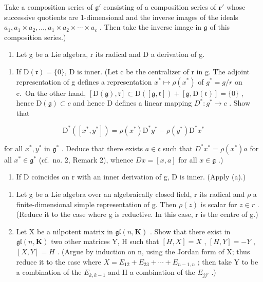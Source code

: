 Take a composition series of \(\mathfrak{g}'\) consisting of a composition series of \(\mathbf{r}'\) whose successive quotients are 1-dimensional and the inverse images of the ideals \(a_1, a_1 \times a_2, \ldots, a_1 \times a_2 \times \cdots \times a_c\) . Then take the inverse image in \(\mathfrak{g}\) of this composition series.)

\begin{enumerate}
\def\labelenumi{\arabic{enumi}.}
\setcounter{enumi}{11}
\tightlist
\item
  Let g be a Lie algebra, r its radical and D a derivation of g.
\end{enumerate}

\begin{enumerate}
\def\labelenumi{(\alph{enumi})}
\tightlist
\item
  If \(\mathrm{D}(\mathfrak{r}) = \{0\} \), D is inner. (Let c be the centralizer of r in g. The adjoint representation of g defines a representation \(x^{*} \mapsto \rho(x^{*})\) of \(g^{*} = g/r\) on c.~On the other hand, \([\mathrm{D}(\mathfrak{g}), \mathfrak{r}] \subset \mathrm{D}([\mathfrak{g}, \mathfrak{r}]) + [\mathfrak{g}, \mathrm{D}(\mathfrak{r})] = \{0\}\) , hence \(\mathrm{D}(\mathfrak{g}) \subset c\) and hence D defines a linear mapping \(D^{*}: g^{*} \to c\) . Show that
\end{enumerate}

\[
\mathrm{D} ^ {*} ([ x ^ {*}, y ^ {*} ]) = \rho (x ^ {*}) \mathrm{D} ^ {*} y ^ {*} - \rho (y ^ {*}) \mathrm{D} ^ {*} x ^ {*}
\]

for all \(x^{*}, y^{*}\) in \(\mathfrak{g}^{*}\) . Deduce that there exists \(a \in \mathfrak{c}\) such that \(D^{*}x^{*} = \rho(x^{*})a\) for all \(x^{*} \in \mathfrak{g}^{*}\) (cf.~no. 2, Remark 2), whence \(Dx = [x, a]\) for all \(x \in \mathfrak{g}\) .)

\begin{enumerate}
\def\labelenumi{(\alph{enumi})}
\setcounter{enumi}{1}
\tightlist
\item
  If D coincides on r with an inner derivation of g, D is inner. (Apply (a).)
\end{enumerate}

\begin{enumerate}
\def\labelenumi{\arabic{enumi}.}
\setcounter{enumi}{12}
\item
  Let g be a Lie algebra over an algebraically closed field, r its radical and \(\rho\) a finite-dimensional simple representation of g. Then \(\rho(z)\) is scalar for \(z \in r\) . (Reduce it to the case where g is reductive. In this case, r is the centre of g.)
\item
  Let X be a nilpotent matrix in \(\mathfrak{gl}(n, \mathbf{K})\) . Show that there exist in \(\mathfrak{gl}(n, \mathbf{K})\) two other matrices Y, H such that \([H, X] = X\) , \([H, Y] = -Y\) , \([X, Y] = H\) . (Argue by induction on n, using the Jordan form of X; thus reduce it to the case where \(X = E_{12} + E_{23} + \cdots + E_{n-1,n}\) ; then take Y to be a combination of the \(E_{k,k-1}\) and H a combination of the \(E_{jj'}\) .)
\end{enumerate}

